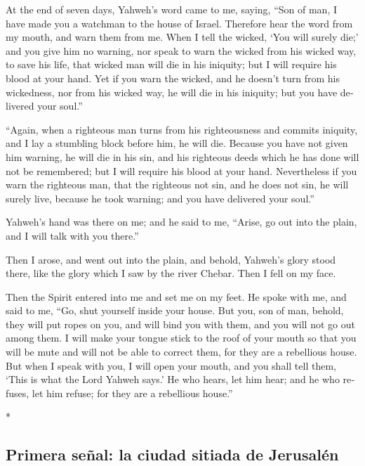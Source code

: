 \begin{paracol}{2}
\begin{otherlanguage}{english}
 At the end of seven days, Yahweh's word came to me,
saying,  ``Son of man, I have made you a watchman to the
house of Israel. Therefore hear the word from my mouth, and warn them
from me.  When I tell the wicked, `You will surely die;'
and you give him no warning, nor speak to warn the wicked from his
wicked way, to save his life, that wicked man will die in his iniquity;
but I will require his blood at your hand.  Yet if you
warn the wicked, and he doesn't turn from his wickedness, nor from his
wicked way, he will die in his iniquity; but you have delivered your
soul.''

 ``Again, when a righteous man turns from his
righteousness and commits iniquity, and I lay a stumbling block before
him, he will die. Because you have not given him warning, he will die in
his sin, and his righteous deeds which he has done will not be
remembered; but I will require his blood at your hand. 
Nevertheless if you warn the righteous man, that the righteous not sin,
and he does not sin, he will surely live, because he took warning; and
you have delivered your soul.''

 Yahweh's hand was there on me; and he said to me,
``Arise, go out into the plain, and I will talk with you there.''

 Then I arose, and went out into the plain, and behold,
Yahweh's glory stood there, like the glory which I saw by the river
Chebar. Then I fell on my face.

 Then the Spirit entered into me and set me on my feet.
He spoke with me, and said to me, ``Go, shut yourself inside your house.
 But you, son of man, behold, they will put ropes on you,
and will bind you with them, and you will not go out among them.
 I will make your tongue stick to the roof of your mouth
so that you will be mute and will not be able to correct them, for they
are a rebellious house.  But when I speak with you, I
will open your mouth, and you shall tell them, `This is what the Lord
Yahweh says.' He who hears, let him hear; and he who refuses, let him
refuse; for they are a rebellious house.''

\end{otherlanguage}

\switchcolumn[0]*

\hypertarget{primera-seuxf1al-la-ciudad-sitiada-de-jerusaluxe9n}{%
\subsection{Primera señal: la ciudad sitiada de
Jerusalén}\label{primera-seuxf1al-la-ciudad-sitiada-de-jerusaluxe9n}}


\end{paracol}
